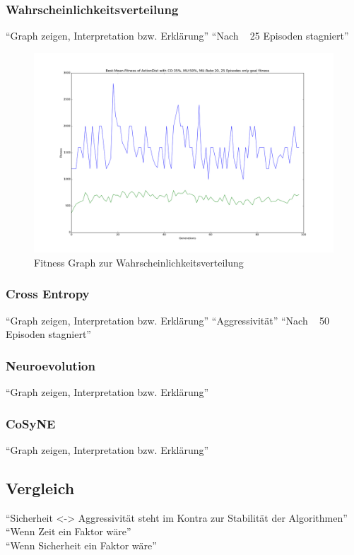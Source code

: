             \subsubsection*{Wahrscheinlichkeitsverteilung}
                ``Graph zeigen, Interpretation bzw. Erklärung''
                ``Nach ~ 25 Episoden stagniert''
            \begin{figure}[htbp]
                \centering
                \includegraphics[width = 1.0\textwidth]{../pictures/actiondist-fitness.png}
                \caption{Fitness Graph zur Wahrscheinlichkeitsverteilung \label{fig:somelabel}}
            \end{figure}
            \subsubsection*{Cross Entropy}
                ``Graph zeigen, Interpretation bzw. Erklärung''
                ``Aggressivität''
                ``Nach ~ 50 Episoden stagniert''
            \subsubsection*{Neuroevolution}
                ``Graph zeigen, Interpretation bzw. Erklärung''
            \subsubsection*{CoSyNE}
                ``Graph zeigen, Interpretation bzw. Erklärung''
        \subsection{Vergleich}
            ``Sicherheit <-> Aggressivität steht im Kontra zur Stabilität der Algorithmen''\\
            ``Wenn Zeit ein Faktor wäre'' \\
            ``Wenn Sicherheit ein Faktor wäre'' \\



